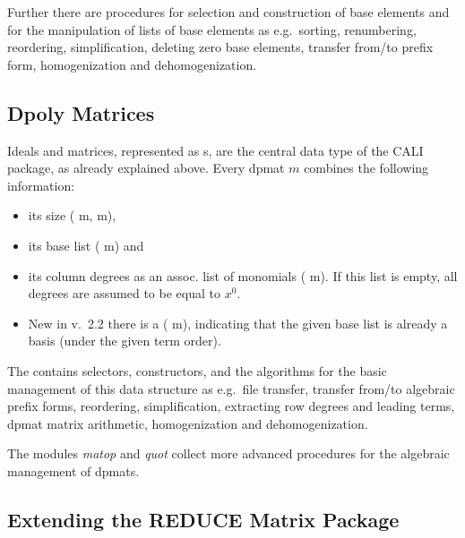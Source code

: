 Further there are procedures for selection and construction of base
elements and for the manipulation of lists of base elements as e.g.\
sorting, renumbering, reordering, simplification, deleting zero base
elements, transfer from/to prefix form, homogenization and dehomogenization. 

\subsection{Dpoly Matrices}

Ideals and matrices, represented as s, are the central
data type of the CALI package, as already explained above. Every
dpmat $m$ combines the following information:
\begin{itemize}
\item its size ( m, m),

\item its base list ( m) and

\item its column degrees as an assoc. list of monomials
( m). If this list is empty, all degrees are
assumed to be equal to $x^0$.

\item New in v.\ 2.2 there is a  ( m),
indicating that the given base list is already a \gr basis (under the
given term order). 
\end{itemize}

The  contains selectors, constructors, and the
algorithms for the basic management of this data structure as e.g.\
file transfer, transfer from/to algebraic prefix forms, reordering,
simplification, extracting row degrees and leading terms, dpmat matrix
arithmetic, homogenization and dehomogenization. 

The modules {\em matop} and {\em quot} collect more advanced procedures 
for the algebraic management of dpmats.

\subsection{Extending the REDUCE Matrix Package}


